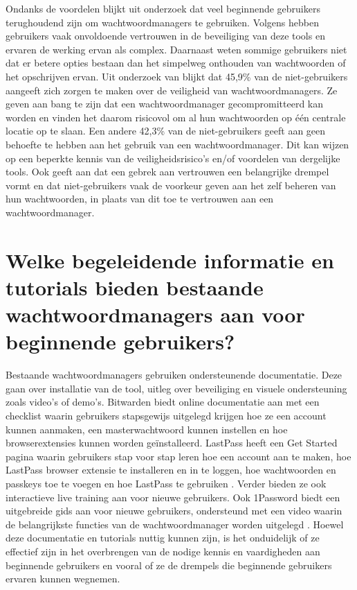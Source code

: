 Ondanks de voordelen blijkt uit onderzoek dat veel beginnende gebruikers terughoudend zijn om wachtwoordmanagers te gebruiken. Volgens \textcite{Pearman2019} hebben gebruikers vaak onvoldoende vertrouwen in de beveiliging van deze tools en ervaren de werking ervan als complex. Daarnaast weten sommige gebruikers niet dat er betere opties bestaan dan het simpelweg onthouden van wachtwoorden of het opschrijven ervan.  
Uit onderzoek van \textcite{Fagan2017} blijkt dat 45,9\% van de niet-gebruikers aangeeft zich zorgen te maken over de veiligheid van wachtwoordmanagers. Ze geven aan bang te zijn dat een wachtwoordmanager gecompromitteerd kan worden en vinden het daarom risicovol om al hun wachtwoorden op één centrale locatie op te slaan. Een andere 42,3\% van de niet-gebruikers geeft aan geen behoefte te hebben aan het gebruik van een wachtwoordmanager. Dit kan wijzen op een beperkte kennis van de veiligheidsrisico's en/of voordelen van dergelijke tools.
Ook \textcite{Ray2021} geeft aan dat een gebrek aan vertrouwen een belangrijke drempel vormt en dat niet-gebruikers vaak de voorkeur geven aan het zelf beheren van hun wachtwoorden, in plaats van dit toe te vertrouwen aan een wachtwoordmanager. 

\section{Welke begeleidende informatie en tutorials bieden bestaande wachtwoordmanagers aan voor beginnende gebruikers?}

Bestaande wachtwoordmanagers gebruiken ondersteunende documentatie. Deze gaan over installatie van de tool, uitleg over beveiliging en visuele ondersteuning zoals video's of demo's.  
Bitwarden biedt online documentatie aan met een checklist waarin gebruikers stapsgewijs uitgelegd krijgen hoe ze een account kunnen aanmaken, een masterwachtwoord kunnen instellen en hoe browserextensies kunnen worden geïnstalleerd. \autocite{Bitwarden}
LastPass heeft een Get Started pagina waarin gebruikers stap voor stap leren hoe een account aan te maken, hoe LastPass browser extensie te installeren en in te loggen, hoe wachtwoorden en passkeys toe te voegen en hoe LastPass te gebruiken \autocite{LastPass2025}. Verder bieden ze ook interactieve live training aan voor nieuwe gebruikers. 
Ook 1Password biedt een uitgebreide gids aan voor nieuwe gebruikers, ondersteund met een video waarin de belangrijkste functies van de wachtwoordmanager worden uitgelegd \autocite{OnePassword}.
Hoewel deze documentatie en tutorials nuttig kunnen zijn, is het onduidelijk of ze effectief zijn in het overbrengen van de nodige kennis en vaardigheden aan beginnende gebruikers en vooral of ze de drempels die beginnende gebruikers ervaren kunnen wegnemen.

